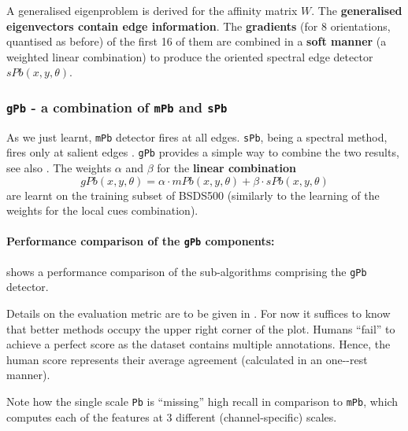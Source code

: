 A generalised eigenproblem is derived for the affinity matrix $W$. The {\bf generalised eigenvectors contain edge information}. %
The {\bf gradients} %
(for 8 orientations, quantised as before) of the first 16 %
of them %
are combined in a {\bf soft manner} (a weighted linear combination) %
to produce the oriented spectral edge detector $sPb(x,y,\theta)$.

\subsubsection{{\tt gPb} - a combination of {\tt mPb} and {\tt sPb}}
\label{sec:ch3-Pb_mPb_sPb_gPb}
As we just learnt, {\tt mPb} detector fires at all edges. {\tt sPb}, being a spectral method, fires only at salient edges \cite{Fowlkes04,Yu2005segmentation}. {\tt gPb} provides a simple way to combine the two results, see also . The weights $\alpha$ and $\beta$ for the {\bf linear combination} 
\[
 gPb(x,y,\theta)=\alpha \cdot mPb(x,y,\theta) + \beta \cdot sPb(x,y,\theta)
\]
are learnt on the training subset of BSDS500 \cite{BSDS500resources} (similarly to the learning of the weights for the local cues combination). %

\paragraph{Performance comparison of the {\tt gPb} components:} 
\label{par:ch3-Pb_mPb_sPb_gPb}
 shows a performance comparison of the sub-algorithms comprising the {\tt gPb} detector. 

Details on the evaluation metric are to be given in . For now it suffices to know that better methods occupy the upper right corner of the plot. Humans ``fail'' to achieve %
a perfect score as the dataset contains multiple annotations. Hence, the human score represents their average agreement (calculated in an one-\vs-rest manner). 

Note how the single scale {\tt Pb} is ``missing'' high recall in comparison to {\tt mPb}, which computes each of the features at 3 different (channel-specific) scales. 


